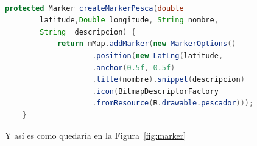  

\begin{lstlisting}[language=java,caption={Creación de Marker  personalizados},label=DescriptiveLabel]
    
protected Marker createMarkerPesca(double
		latitude,Double longitude, String nombre,
		String	descripcion) {
       		return mMap.addMarker(new MarkerOptions()
                	.position(new LatLng(latitude, 							longitude))
                	.anchor(0.5f, 0.5f)
                	.title(nombre).snippet(descripcion)
	                .icon(BitmapDescriptorFactory
    	       		.fromResource(R.drawable.pescador)));
    }


\end{lstlisting} 
 
 
 
 Y así es como quedaría en la Figura~\ref{fig:marker}  

 
 
